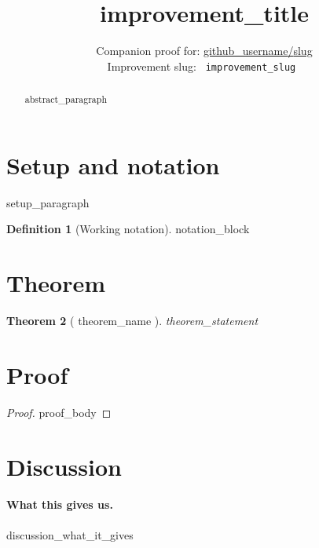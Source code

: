 \documentclass[11pt]{article}
\title{ {{improvement_title}} }
\author{Companion proof for: \href{ {{repo_url}} }{ {{github_username}}/{{slug}} } \\ \small Improvement slug: \texttt{ {{improvement_slug}} }}
\date{}
\newtheorem{theorem}{Theorem}
\theoremstyle{definition}
\newtheorem{definition}[theorem]{Definition}
\theoremstyle{remark}
\begin{document}
\maketitle

\begin{abstract}
{{abstract_paragraph}}
\end{abstract}

\section*{Setup and notation}

{{setup_paragraph}}

\begin{definition}[Working notation]
{{notation_block}}
\end{definition}

\section*{Theorem}

\begin{theorem}[ {{theorem_name}} ]
\label{thm:main}
{{theorem_statement}}
\end{theorem}

\section*{Proof}

\begin{proof}
{{proof_body}}
\end{proof}

\section*{Discussion}

\paragraph{What this gives us.}
{{discussion_what_it_gives}}
\end{document}
